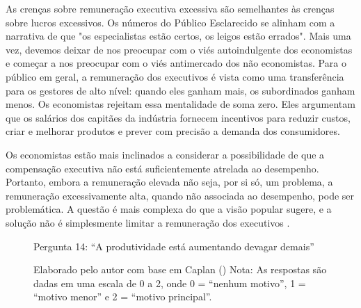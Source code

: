 As crenças sobre remuneração executiva excessiva são semelhantes às crenças sobre lucros excessivos. Os números do Público Esclarecido se alinham com a narrativa de que "os especialistas estão certos, os leigos estão errados". Mais uma vez, devemos deixar de nos preocupar com o viés autoindulgente dos economistas e começar a nos preocupar com o viés antimercado dos não economistas. Para o público em geral, a remuneração dos executivos é vista como uma transferência para os gestores de alto nível: quando eles ganham mais, os subordinados ganham menos. Os economistas rejeitam essa mentalidade de soma zero. Eles argumentam que os salários dos capitães da indústria fornecem incentivos para reduzir custos, criar e melhorar produtos e prever com precisão a demanda dos consumidores.

Os economistas estão mais inclinados a considerar a possibilidade de que a compensação executiva não está suficientemente atrelada ao desempenho. Portanto, embora a remuneração elevada não seja, por si só, um problema, a remuneração excessivamente alta, quando não associada ao desempenho, pode ser problemática. A questão é mais complexa do que a visão popular sugere, e a solução não é simplesmente limitar a remuneração dos executivos \cite{The_Myth_of_the_Rational_Voter}.



\begin{figure}[H]
    \centering
    \caption*{Pergunta 14: “A produtividade está aumentando devagar demais”}
    \caption{Elaborado pelo autor com base em Caplan (\citeyear{The_Myth_of_the_Rational_Voter}) \newline
    Nota: As respostas são dadas em uma escala de 0 a 2, onde 0 = “nenhum motivo”, 1 = “motivo menor” e 2 = “motivo principal”.}
    \label{fig:pergunta_14}
\end{figure}

